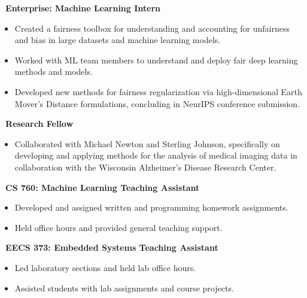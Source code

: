 \documentclass[]{article}
\begin{document}
 \newline
{\bf \ Enterprise: Machine Learning Intern}
\begin{itemize}[label={$\bullet$}]
	\item Created a fairness toolbox for understanding and accounting for unfairness and bias in large datasets and machine learning models.
	\item Worked with ML team members to understand and deploy fair deep learning methods and models.
	\item Developed new methods for fairness regularization via high-dimensional Earth Mover's Distance formulations, concluding in NeurIPS conference submission.
\end{itemize}

 \newline
{\bf \ Research Fellow}
\begin{itemize}[label={$\bullet$}]
	\item Collaborated with Michael Newton and Sterling Johnson, specifically on developing and applying methods for the analysis of medical imaging data in collaboration with the Wisconsin Alzheimer's Disease Research Center.
\end{itemize} 

 \newline
{\bf \ CS 760: Machine Learning Teaching Assistant}
\begin{itemize}[label={$\bullet$}]
	\item Developed and assigned written and programming homework assignments.
	\item Held office hours and provided general teaching support.
\end{itemize} 

\newpage

 \newline
{\bf \ EECS 373: Embedded Systems Teaching Assistant}
\begin{itemize}[label={$\bullet$}]
	\item Led laboratory sections and held lab office hours.
	\item Assisted students with lab assignments and course projects.
\end{itemize}
\end{document}
